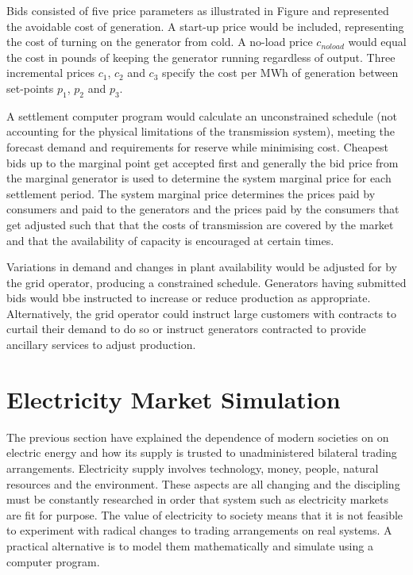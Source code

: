
Bids consisted of five price parameters as illustrated in Figure
and represented the avoidable cost of generation. A start-up price would be
included, representing the cost of turning on the generator from cold.  A
no-load price $c_{noload}$ would equal the cost in pounds of keeping the
generator running regardless of output. Three incremental prices $c_1$, $c_2$
and $c_3$ specify the cost per MWh of generation between set-points $p_1$,
$p_2$ and $p_3$.

A settlement computer program would calculate an unconstrained schedule (not
accounting for the physical limitations of the transmission system), meeting
the forecast demand and requirements for reserve while minimising cost.
Cheapest bids up to the marginal point get accepted first and generally the bid
price from the marginal generator is used to determine the system marginal
price for each settlement period.  The system marginal price determines the
prices paid by consumers and paid to the generators and the prices paid by the
consumers that get adjusted such that that the costs of transmission are
covered by the market and that the availability of capacity is encouraged at
certain times.

Variations in demand and changes in plant availability would be adjusted for by
the grid operator, producing a constrained schedule.  Generators having
submitted bids would bbe instructed to increase or reduce production as
appropriate.  Alternatively, the grid operator could instruct large customers
with contracts to curtail their demand to do so or instruct generators
contracted to provide ancillary services to adjust production.

\section{Electricity Market Simulation}
The previous section have explained the dependence of modern societies on on
electric energy and how its supply is trusted to unadministered bilateral
trading arrangements.  Electricity supply involves technology, money, people,
natural resources and the environment.  These aspects are all changing and the
discipling must be constantly researched in order that system such as
electricity markets are fit for purpose.  The value of electricity to society
means that it is not feasible to experiment with radical changes to trading
arrangements on real systems.  A practical alternative is to model them
mathematically and simulate using a computer program.

